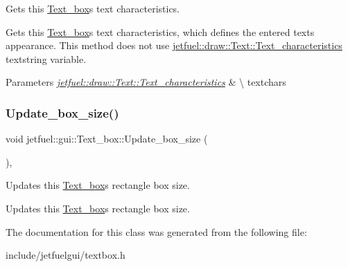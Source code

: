 Gets this \hyperlink{classjetfuel_1_1gui_1_1Text__box}{Text\+\_\+box}\textquotesingle{}s text characteristics. 

Gets this \hyperlink{classjetfuel_1_1gui_1_1Text__box}{Text\+\_\+box}\textquotesingle{}s text characteristics, which defines the entered text\textquotesingle{}s appearance. This method does not use \hyperlink{structjetfuel_1_1draw_1_1Text_1_1Text__characteristics}{jetfuel\+::draw\+::\+Text\+::\+Text\+\_\+characteristics}\textquotesingle{} textstring variable.


\begin{DoxyParams}{Parameters}
{\em \hyperlink{structjetfuel_1_1draw_1_1Text_1_1Text__characteristics}{jetfuel\+::draw\+::\+Text\+::\+Text\+\_\+characteristics}} & \textbackslash{} textchars \\
\hline
\end{DoxyParams}
\mbox{\label{classjetfuel_1_1gui_1_1Text__box_a5fe0ab8595f220ce22945e126e0b79bd}} 
\subsubsection{\texorpdfstring{Update\+\_\+box\+\_\+size()}{Update\_box\_size()}}
{\footnotesize\ttfamily void jetfuel\+::gui\+::\+Text\+\_\+box\+::\+Update\+\_\+box\+\_\+size (\begin{DoxyParamCaption}{ }\end{DoxyParamCaption})\hspace{0.3cm}{\ttfamily [inline]}, {\ttfamily [protected]}}



Updates this \hyperlink{classjetfuel_1_1gui_1_1Text__box}{Text\+\_\+box}\textquotesingle{}s rectangle box size. 

Updates this \hyperlink{classjetfuel_1_1gui_1_1Text__box}{Text\+\_\+box}\textquotesingle{}s rectangle box size. 

The documentation for this class was generated from the following file\+:\begin{DoxyCompactItemize}
\item 
include/jetfuelgui/textbox.\+h\end{DoxyCompactItemize}
